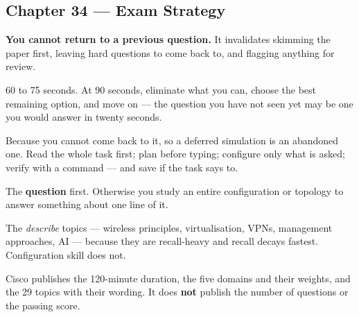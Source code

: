 \subsection*{Chapter 34 --- Exam Strategy}
\begin{tightnum}
  \item \textbf{You cannot return to a previous question.} It invalidates
        skimming the paper first, leaving hard questions to come back to, and
        flagging anything for review.
  \item 60 to 75 seconds. At 90 seconds, eliminate what you can, choose the best
        remaining option, and move on --- the question you have not seen yet may be
        one you would answer in twenty seconds.
  \item Because you cannot come back to it, so a deferred simulation is an
        abandoned one. Read the whole task first; plan before typing; configure
        only what is asked; verify with a  command --- and save if the
        task says to.
  \item The \textbf{question} first. Otherwise you study an entire configuration
        or topology to answer something about one line of it.
  \item The \emph{describe} topics --- wireless principles, virtualisation, VPNs,
        management approaches, AI --- because they are recall-heavy and recall
        decays fastest. Configuration skill does not.
  \item Cisco publishes the 120-minute duration, the five domains and their
        weights, and the 29 topics with their wording. It does \textbf{not}
        publish the number of questions or the passing score.
\end{tightnum}
